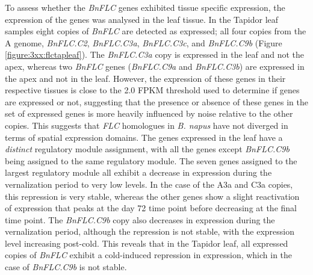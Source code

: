 \documentclass[12pt,]{book}
\begin{document}
To assess whether the \emph{BnFLC} genes exhibited tissue specific
expression, the expression of the genes was analysed in the leaf tissue.
In the Tapidor leaf samples eight copies of \emph{BnFLC} are detected as
expressed; all four copies from the A genome, \emph{BnFLC.C2},
\emph{BnFLC.C3a}, \emph{BnFLC.C3c}, and \emph{BnFLC.C9b} (Figure
\ref{figure:3xx:flctapleaf}). The \emph{BnFLC.C3a} copy is expressed in
the leaf and not the apex, whereas two \emph{BnFLC} genes
(\emph{BnFLC.C9a} and \emph{BnFLC.C3b}) are expressed in the apex and
not in the leaf. However, the expression of these genes in their
respective tissues is close to the 2.0 FPKM threshold used to determine
if genes are expressed or not, suggesting that the presence or absence
of these genes in the set of expressed genes is more heavily influenced
by noise relative to the other copies. This suggests that \emph{FLC}
homologues in \emph{B. napus} have not diverged in terms of spatial
expression domains. The genes expressed in the leaf have a
\emph{distinct} regulatory module assignment, with all the genes except
\emph{BnFLC.C9b} being assigned to the same regulatory module. The seven
genes assigned to the largest regulatory module all exhibit a decrease
in expression during the vernalization period to very low levels. In the
case of the A3a and C3a copies, this repression is very stable, whereas
the other genes show a slight reactivation of expression that peaks at
the day 72 time point before decreasing at the final time point. The
\emph{BnFLC.C9b} copy also decreases in expression during the
vernalization period, although the repression is not stable, with the
expression level increasing post-cold. This reveals that in the Tapidor
leaf, all expressed copies of \emph{BnFLC} exhibit a cold-induced
repression in expression, which in the case of \emph{BnFLC.C9b} is not
stable.
\end{document}
